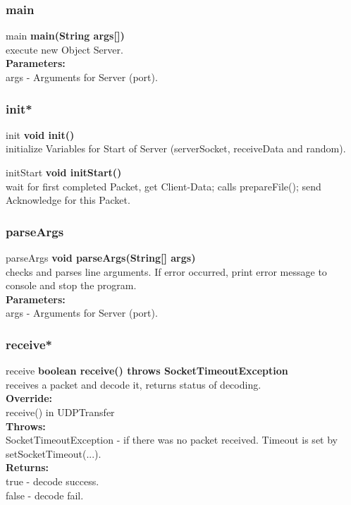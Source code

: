 \documentclass[12pt]{article}
\begin{document}
\subsubsection{main}
\begin{mybox}[colback=lightgray]{main}
\textbf{main(String args[])} \\
execute new Object Server.
\\
\textbf{Parameters:} \\
args - Arguments for Server (port).
\end{mybox}

\subsubsection{init*}
\begin{mybox}[colback=white]{init}
\textbf{void init()} \\
initialize Variables for Start of Server (serverSocket, receiveData and random).
\end{mybox}

\begin{mybox}[colback=white]{initStart}
\textbf{void initStart()} \\
wait for first completed Packet, get Client-Data; calls prepareFile();
send Acknowledge for this Packet.
\end{mybox}

\subsubsection{parseArgs}
\begin{mybox}[colback=white]{parseArgs}
\textbf{void parseArgs(String[] args)} \\
checks and parses line arguments. If error occurred, print error message to console and stop the program. 
\\
\textbf{Parameters:} \\
args - Arguments for Server (port).
\end{mybox}

\subsubsection{receive*}
\begin{mybox}[colback=white]{receive}
\textbf{boolean receive() throws SocketTimeoutException} \\
receives a packet and decode it, returns status of decoding.
\\
\textbf{Override:} \\
receive() in UDPTransfer \\
\textbf{Throws:} \\
SocketTimeoutException - if there was no packet received. Timeout is
set by setSocketTimeout(...). \\
\textbf{Returns:} \\
true - decode success. \\
false - decode fail.
\end{mybox}
\end{document}
